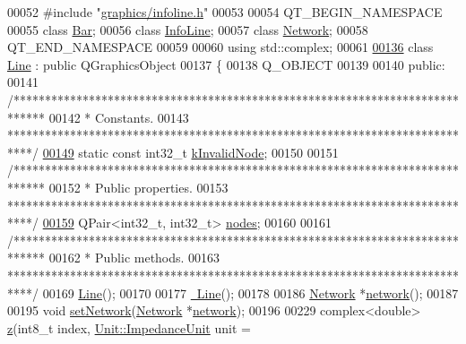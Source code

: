 \begin{DoxyCode}
00052 \textcolor{preprocessor}{#include "\hyperlink{infoline_8h}{graphics/infoline.h}"}
00053 
00054 QT\_BEGIN\_NAMESPACE
00055 \textcolor{keyword}{class }\hyperlink{class_bar}{Bar};
00056 \textcolor{keyword}{class }\hyperlink{class_info_line}{InfoLine};
00057 \textcolor{keyword}{class }\hyperlink{class_network}{Network};
00058 QT\_END\_NAMESPACE
00059 
00060 \textcolor{keyword}{using} std::complex;
00061 
\hypertarget{line_8h_source_l00136}{}\hyperlink{class_line}{00136} \textcolor{keyword}{class }\hyperlink{class_line}{Line} : \textcolor{keyword}{public} QGraphicsObject
00137 \{
00138   Q\_OBJECT
00139 
00140 \textcolor{keyword}{public}:
00141   \textcolor{comment}{/*****************************************************************************}
00142 \textcolor{comment}{   * Constants.}
00143 \textcolor{comment}{   ****************************************************************************/}
\hypertarget{line_8h_source_l00149}{}\hyperlink{group___models_gadc334bd07c6126abc56e531d7e3e72b4}{00149}   \textcolor{keyword}{static} \textcolor{keyword}{const} int32\_t \hyperlink{group___models_gadc334bd07c6126abc56e531d7e3e72b4}{kInvalidNode};
00150 
00151   \textcolor{comment}{/*****************************************************************************}
00152 \textcolor{comment}{   * Public properties.}
00153 \textcolor{comment}{   ****************************************************************************/}
\hypertarget{line_8h_source_l00159}{}\hyperlink{class_line_afd17c40d656e6a8d677cb22df5f0c70b}{00159}   QPair<int32\_t, int32\_t> \hyperlink{class_line_afd17c40d656e6a8d677cb22df5f0c70b}{nodes};
00160 
00161   \textcolor{comment}{/*****************************************************************************}
00162 \textcolor{comment}{   * Public methods.}
00163 \textcolor{comment}{   ****************************************************************************/}
00169   \hyperlink{group___models_gacc11b8a429d8cdd63ba6803dff5602b3}{Line}();
00170 
00177   \hyperlink{group___models_gaabe85f48d22d92b62257091f48174fac}{~Line}();
00178 
00186   \hyperlink{class_network}{Network} *\hyperlink{group___models_gaa4cfa330c9c53ddaf86c8f5c17ba1ee0}{network}();
00187 
00195   \textcolor{keywordtype}{void} \hyperlink{group___models_ga320766e09f0ea36b2dd07d3b1db1b72e}{setNetwork}(\hyperlink{class_network}{Network} *\hyperlink{group___models_gaa4cfa330c9c53ddaf86c8f5c17ba1ee0}{network});
00196 
00229   complex<double>  \hyperlink{group___models_ga0b44ccb2f14635c42d7eab3fe8940692}{z}(int8\_t index, \hyperlink{class_unit_a3747e779c805df24a71961290be3fbdf}{Unit::ImpedanceUnit} unit = 

\end{DoxyCode}
